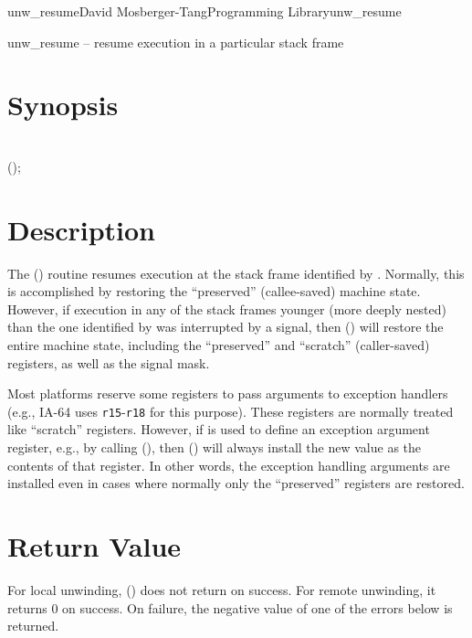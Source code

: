 \documentclass{article}
\begin{document}
\begin{Name}{3}{unw\_resume}{David Mosberger-Tang}{Programming Library}{unw\_resume}

  unw\_resume -- resume execution in a particular stack frame
\end{Name}

\section{Synopsis}

\\

 ();\\

\section{Description}

The () routine resumes execution at the stack frame
identified by .  Normally, this is accomplished by
restoring the ``preserved'' (callee-saved) machine state.  However, if
execution in any of the stack frames younger (more deeply nested) than
the one identified by  was interrupted by a signal, then
() will restore the entire machine state, including
the ``preserved'' and ``scratch'' (caller-saved) registers, as well as
the signal mask.

Most platforms reserve some registers to pass arguments to exception
handlers (e.g., IA-64 uses \texttt{r15}-\texttt{r18} for this
purpose).  These registers are normally treated like ``scratch''
registers.  However, if  is used to define an
exception argument register, e.g., by calling (),
then () will always install the new value as the
contents of that register.  In other words, the exception handling
arguments are installed even in cases where normally only the
``preserved'' registers are restored.

\section{Return Value}

For local unwinding, () does not return on success.
For remote unwinding, it returns 0 on success.  On failure, the
negative value of one of the errors below is returned.
\end{document}
